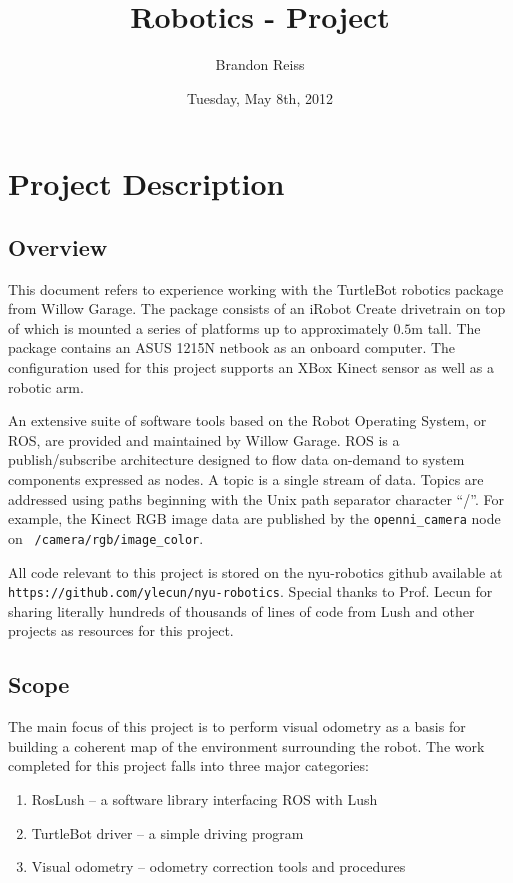 \documentclass[letterpaper]{article}%
\author{Brandon Reiss}
\date{Tuesday, May 8th, 2012}
\title{Robotics - Project}
\begin{document}
\maketitle

\def\cpp{${\rm C}^{++}$}

\section*{Project Description}%

\subsection{Overview}
This document refers to experience working with the TurtleBot robotics package
from Willow Garage. The package consists of an iRobot Create drivetrain on top
of which is mounted a series of platforms up to approximately $0.5$m tall. The
package contains an ASUS 1215N netbook as an onboard computer. The
configuration used for this project supports an XBox Kinect sensor as well as a
robotic arm.

An extensive suite of software tools based on the Robot Operating System, or
ROS, are provided and maintained by Willow Garage. ROS is a publish/subscribe
architecture designed to flow data on-demand to system components expressed as
nodes. A topic is a single stream of data. Topics are addressed using paths
beginning with the Unix path separator character ``/''. For example, the Kinect
RGB image data are published by the {\tt openni\_camera} node on {\tt
/camera/rgb/image\_color}.

All code relevant to this project is stored on the nyu-robotics github
available at \linebreak
{\tt https://github.com/ylecun/nyu-robotics}. Special thanks to Prof. Lecun for
sharing literally hundreds of thousands of lines of code from Lush and other
projects as resources for this project.

\subsection{Scope}
The main focus of this project is to perform visual odometry as a basis for
building a coherent map of the environment surrounding the robot.
The work completed for this project falls into three major categories:
\begin{enumerate}
  \item RosLush -- a software library interfacing ROS with Lush
  \item TurtleBot driver -- a simple driving program
  \item Visual odometry -- odometry correction tools and procedures
\end{enumerate}
\end{document}
